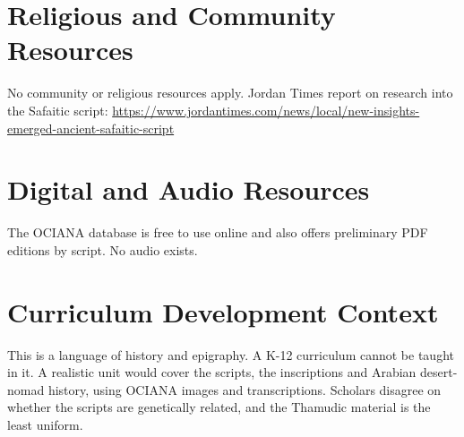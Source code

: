 \documentclass[12pt]{article}
\begin{document}
\section{Religious and Community Resources}
No community or religious resources apply. Jordan Times report on research into the Safaitic script: \url{https://www.jordantimes.com/news/local/new-insights-emerged-ancient-safaitic-script}

\section{Digital and Audio Resources}
The OCIANA database is free to use online and also offers preliminary PDF editions by script. No audio exists.

\section{Curriculum Development Context}
This is a language of history and epigraphy. A K-12 curriculum cannot be taught in it. A realistic unit would cover the scripts, the inscriptions and Arabian desert-nomad history, using OCIANA images and transcriptions. Scholars disagree on whether the scripts are genetically related, and the Thamudic material is the least uniform.
\end{document}
